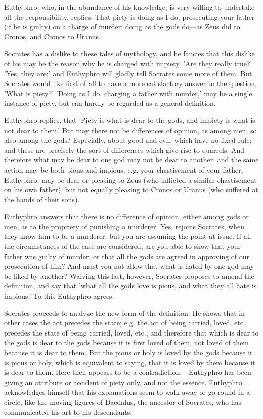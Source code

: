 \documentclass[11pt,letter]{article}
\begin{document}
\par  Euthyphro, who, in the abundance of his knowledge, is very willing to undertake all the responsibility, replies: That piety is doing as I do, prosecuting your father (if he is guilty) on a charge of murder; doing as the gods do—as Zeus did to Cronos, and Cronos to Uranus.

\par  Socrates has a dislike to these tales of mythology, and he fancies that this dislike of his may be the reason why he is charged with impiety. 'Are they really true?' 'Yes, they are;' and Euthyphro will gladly tell Socrates some more of them. But Socrates would like first of all to have a more satisfactory answer to the question, 'What is piety?' 'Doing as I do, charging a father with murder,' may be a single instance of piety, but can hardly be regarded as a general definition.

\par  Euthyphro replies, that 'Piety is what is dear to the gods, and impiety is what is not dear to them.' But may there not be differences of opinion, as among men, so also among the gods? Especially, about good and evil, which have no fixed rule; and these are precisely the sort of differences which give rise to quarrels. And therefore what may be dear to one god may not be dear to another, and the same action may be both pious and impious; e.g. your chastisement of your father, Euthyphro, may be dear or pleasing to Zeus (who inflicted a similar chastisement on his own father), but not equally pleasing to Cronos or Uranus (who suffered at the hands of their sons).

\par  Euthyphro answers that there is no difference of opinion, either among gods or men, as to the propriety of punishing a murderer. Yes, rejoins Socrates, when they know him to be a murderer; but you are assuming the point at issue. If all the circumstances of the case are considered, are you able to show that your father was guilty of murder, or that all the gods are agreed in approving of our prosecution of him? And must you not allow that what is hated by one god may be liked by another? Waiving this last, however, Socrates proposes to amend the definition, and say that 'what all the gods love is pious, and what they all hate is impious.' To this Euthyphro agrees.

\par  Socrates proceeds to analyze the new form of the definition. He shows that in other cases the act precedes the state; e.g. the act of being carried, loved, etc. precedes the state of being carried, loved, etc., and therefore that which is dear to the gods is dear to the gods because it is first loved of them, not loved of them because it is dear to them. But the pious or holy is loved by the gods because it is pious or holy, which is equivalent to saying, that it is loved by them because it is dear to them. Here then appears to be a contradiction,—Euthyphro has been giving an attribute or accident of piety only, and not the essence. Euthyphro acknowledges himself that his explanations seem to walk away or go round in a circle, like the moving figures of Daedalus, the ancestor of Socrates, who has communicated his art to his descendants.
\end{document}
